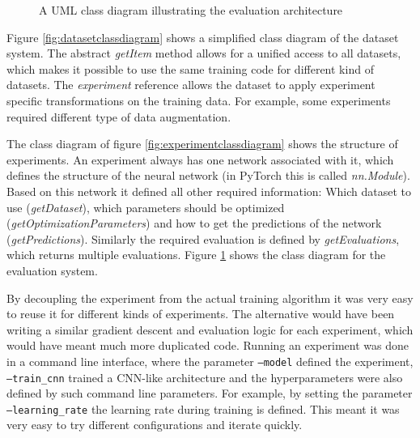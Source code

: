 \documentclass[draft,final,oneside]{vutinfth} %
\begin{document}
\begin{figure}
	\centering
{}
	\caption{A UML class diagram illustrating the evaluation architecture}
	\label{fig:evaluationclassdiagram}
\end{figure}

Figure \ref{fig:datasetclassdiagram} shows a simplified class diagram of the dataset system. The abstract \textit{getItem} method allows for a unified access to all datasets, which makes it possible to use the same training code for different kind of datasets. The \textit{experiment} reference allows the dataset to apply experiment specific transformations on the training data. For example, some experiments required different type of data augmentation.

The class diagram of figure \ref{fig:experimentclassdiagram} shows the structure of experiments. An experiment always has one network associated with it, which defines the structure of the neural network (in PyTorch this is called \textit{nn.Module}). Based on this network it defined all other required information: Which dataset to use (\textit{getDataset}), which parameters should be optimized (\textit{getOptimizationParameters}) and how to get the predictions of the network (\textit{getPredictions}). Similarly the required evaluation is defined by \textit{getEvaluations}, which returns multiple evaluations. Figure \ref{fig:evaluationclassdiagram} shows the class diagram for the evaluation system.

By decoupling the experiment from the actual training algorithm it was very easy to reuse it for different kinds of experiments. The alternative would have been writing a similar gradient descent and evaluation logic for each experiment, which would have meant much more duplicated code. Running an experiment was done in a command line interface, where the parameter \texttt{--model} defined the experiment, \texttt{--train\_cnn} trained a CNN-like architecture and the hyperparameters were also defined by such command line parameters. For example, by setting the parameter \texttt{--learning\_rate} the learning rate during training is defined. This meant it was very easy to try different configurations and iterate quickly.
\end{document}
